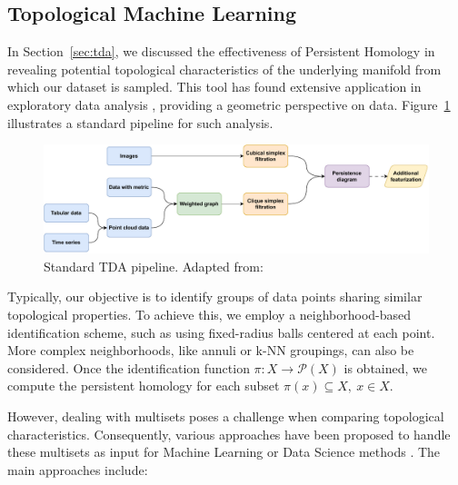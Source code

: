\documentclass[../main.tex]{subfiles}
\begin{document}
\subsection{Topological Machine Learning}
\label{sec:topoML}

In Section~\ref{sec:tda}, we discussed the effectiveness of Persistent Homology in revealing potential topological characteristics of the underlying manifold from which our dataset is sampled. This tool has found extensive application in exploratory data analysis \cite{cheng_application_2020, topaz_topological_2015, amezquita_shape_2020}, providing a geometric perspective on data. Figure~\ref{fig:tdaPipe} illustrates a standard pipeline for such analysis.

\begin{figure}[!ht]
\centering
\includegraphics[width=\textwidth]{figures/bg/pipelineTDA.pdf} 
\caption{Standard TDA pipeline. Adapted from: \cite{berwald_mathematics_2019}}
\label{fig:tdaPipe}
\end{figure}

Typically, our objective is to identify groups of data points sharing similar topological properties. To achieve this, we employ a neighborhood-based identification scheme, such as using fixed-radius balls centered at each point. More complex neighborhoods, like annuli or k-NN groupings, can also be considered. Once the identification function $\pi: X \to \mathcal{P}(X)$ is obtained, we compute the persistent homology for each subset $\pi(x) \subseteq X,\ x \in X$.

However, dealing with multisets poses a challenge when comparing topological characteristics. Consequently, various approaches have been proposed to handle these multisets as input for Machine Learning or Data Science methods \cite{hensel_survey_2021}. The main approaches include:
\end{document}
